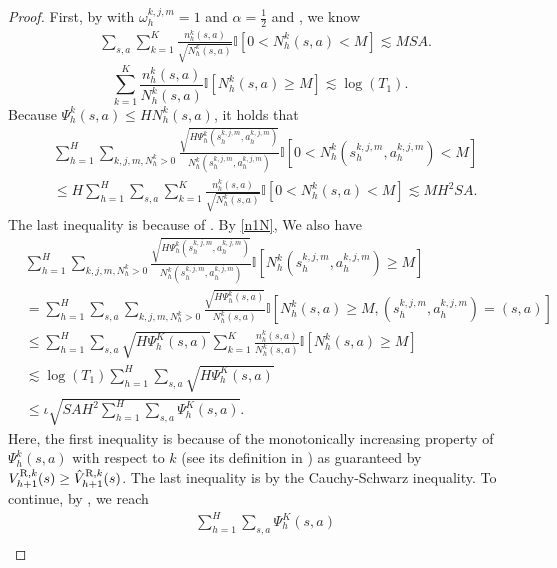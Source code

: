 \documentclass{article}
\newcommand{\R}{\textnormal{R}}
\begin{document}
\begin{proof}
First, by  with $\omega_h^{k,j,m} =1$ and $\alpha = \frac{1}{2}$ and , we know
\begin{align}
\label{n12N}
    &\sum_{s,a}\sum_{k=1}^K \frac{n_h^k(s,a)}{\sqrt{N_h^k(s,a)}}\mathbb{I}\left[ 0< N_h^k(s,a)< M\right] 
    \lesssim MSA.
\end{align}
\begin{equation}
\label{n1N}
    \sum_{k=1}^K \frac{n_h^k(s,a)}{N_h^k(s,a)}\mathbb{I}\left[ N_h^k(s,a)\geq M\right] \lesssim \log(T_1).
\end{equation}
Because $\Psi_h^k(s,a) \leq HN_h^k(s,a)$, it holds that
\begin{align}
\label{psi1}
    &\sum_{h=1}^H\sum_{k,j,m,N_h^k >0} \frac{\sqrt{H\Psi_h^k(s_h^{k,j,m}, a_h^{k,j,m})}}{N_h^k(s_h^{k,j,m}, a_h^{k,j,m})}\mathbb{I}\left[ 0<N_h^k(s_h^{k,j,m}, a_h^{k,j,m})< M\right] \nonumber\\
    &\leq H\sum_{h=1}^H\sum_{s,a}\sum_{k=1}^K \frac{n_h^k(s,a)}{\sqrt{N_h^k(s,a)}}\mathbb{I}\left[ 0<N_h^k(s,a)< M\right] \lesssim MH^2SA.
\end{align}
The last inequality is because of . By \cref{n1N}, We also have
\begin{align}
    &\sum_{h=1}^H\sum_{k,j,m,N_h^k >0} \frac{\sqrt{H\Psi_h^k(s_h^{k,j,m}, a_h^{k,j,m})}}{N_h^k(s_h^{k,j,m}, a_h^{k,j,m})}\mathbb{I}\left[ N_h^k(s_h^{k,j,m}, a_h^{k,j,m})\geq M\right] \nonumber \\
    & =\sum_{h=1}^H\sum_{s,a}\sum_{k,j,m,N_h^k >0} \frac{\sqrt{H\Psi_h^k(s,a)}}{N_h^k(s,a)}\mathbb{I}\left[ N_h^k(s,a)\geq M, (s_h^{k,j,m}, a_h^{k,j,m}) = (s,a)\right] \nonumber \\
    &\leq \sum_{h=1}^H\sum_{s,a} \sqrt{H\Psi_h^{K}(s,a)}\sum_{k=1}^K \frac{n_h^k(s,a)}{N_h^k(s,a)}\mathbb{I}\left[ N_h^k(s,a)\geq M\right]\nonumber \\
    &\lesssim \log(T_1)\sum_{h=1}^H\sum_{s,a} \sqrt{H\Psi_h^{K}(s,a)} \nonumber\\
    &\leq \iota\sqrt{SAH^2 \sum_{h=1}^H\sum_{s,a} \Psi_h^{K}(s,a)}. \label{sumpsibegin}
\end{align}
Here, the first inequality is because of the monotonically increasing property of $\Psi_h^k(s,a)$ with respect to $k$ (see its definition in ) as guaranteed by  $V_{h+1}^{\R,k}(s) \geq \hat{V}_{h+1}^{\R,k}(s)$. The last inequality is by the Cauchy-Schwarz inequality. To continue, by , we reach
\begin{align}
    &\sum_{h=1}^H\sum_{s,a} \Psi_h^{K}(s,a) \nonumber\\

\end{align}
\end{proof}
\end{document}
